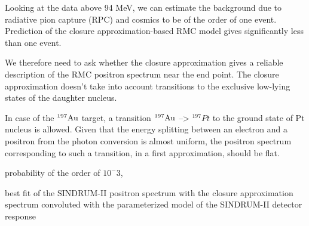 \documentclass[12pt]{article}
\newcommand {\Au}[1]     {\mbox{$\rm ^{#1}Au$}}                 %
\begin{document}
Looking at the data above 94 MeV, we can estimate the background due to radiative
pion capture (RPC) and cosmics to be of the order of one event.
Prediction of the closure approximation-based RMC model gives significantly less
than one event.

We therefore need to ask whether the closure approximation gives a reliable
description of the RMC positron spectrum near the end point. The closure approximation
doesn't take into account transitions to the exclusive low-lying states of the daughter
nucleus.

In case of the \Au{197} target, a transition \Au{197} --> $^{197}Pt$ to
the ground state of Pt nucleus is allowed. Given that the energy splitting between
an electron and a positron from the photon conversion is almost uniform,
the positron spectrum corresponding to such a transition, in a first approximation,
should be flat. 

probability of the order of $10^-3$, 

\vspace{0.1in}
 {
  \label{fig:ana_step2_ppos_best_fit}
  best fit of the SINDRUM-II positron spectrum with the closure approximation
  spectrum convoluted with the parameterized model of the SINDRUM-II detector
  response
}
\vspace{0.1in}
\end{document}
